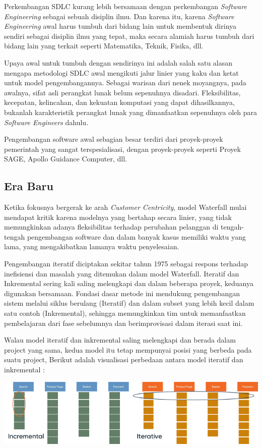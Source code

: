 Perkembangan SDLC kurang lebih bersamaan dengan perkembangan \emph{Software Engineering} sebagai 
sebuah disiplin ilmu. Dan karena itu, karena \emph{Software Engineering} awal harus tumbuh dari bidang 
lain untuk membentuk dirinya sendiri sebagai disiplin ilmu yang tepat, maka secara alamiah harus 
tumbuh dari bidang lain yang terkait seperti Matematika, Teknik, Fisika, dll.

Upaya awal untuk tumbuh dengan sendirinya ini adalah salah satu alasan mengapa metodologi 
SDLC awal mengikuti jalur linier yang kaku dan ketat untuk model pengembangannya. 
Sebagai warisan dari nenek moyangnya, pada awalnya, sifat asli perangkat lunak belum sepenuhnya disadari. 
Fleksibilitas, kecepatan, kelincahan, dan kekuatan komputasi yang dapat dihasilkannya, bukanlah karakteristik perangkat 
lunak yang dimanfaatkan sepenuhnya oleh para \emph{Software Engineers} dahulu.

Pengembangan software awal sebagian besar terdiri dari proyek-proyek pemerintah yang sangat terspesialisasi, 
dengan proyek-proyek seperti Proyek SAGE, Apollo Guidance Computer, dll.


\subsection{Era Baru}
Ketika fokusnya bergerak ke arah \emph{Customer Centricity}, model Waterfall mulai mendapat kritik karena modelnya yang bertahap 
secara linier, yang tidak memungkinkan adanya fleksibilitas terhadap perubahan pelanggan di tengah-tengah pengembangan software
dan dalam banyak kasus memiliki waktu yang lama, yang mengakibatkan lamanya waktu penyelesaian.

Pengembangan iteratif diciptakan sekitar tahun 1975 sebagai respons terhadap inefisiensi dan masalah yang ditemukan dalam model Waterfall.
Iteratif dan Inkremental sering kali saling melengkapi dan dalam beberapa proyek, keduanya digunakan bersamaan. 
Fondasi dasar metode ini mendukung pengembangan sistem melalui siklus berulang (Iteratif) dan dalam subset yang 
lebih kecil dalam satu contoh (Inkremental), sehingga memungkinkan tim untuk memanfaatkan pembelajaran dari 
fase sebelumnya dan berimprovisasi dalam iterasi saat ini.

Walau model iteratif dan inkremental saling melengkapi dan berada dalam project yang sama,
kedua model itu tetap mempunyai posisi yang berbeda pada suatu project,
Berikut adalah visualisasi perbedaan antara model iteratif dan inkremental :

\includegraphics[width=1.1\textwidth, angle=-90]{images/incr-vs-interative.png}

